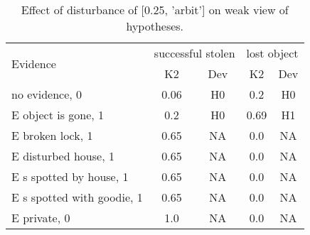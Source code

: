 \begin{table}\begin{tabular}{l|cc|cc}\toprule\multirow{2}{*}{Evidence} & \multicolumn{2}{c}{successful stolen}& \multicolumn{2}{c}{lost object}\\& {K2} & {Dev}& {K2} & {Dev}\\\midrule
no evidence, 0 & \cellcolor{Bittersweet}0.06&\cellcolor{Bittersweet}H0&\cellcolor{Bittersweet}0.2&\cellcolor{Bittersweet}H0\\E object is gone, 1 & \cellcolor{Bittersweet}0.2&\cellcolor{Bittersweet}H0&\cellcolor{Bittersweet}0.69&\cellcolor{Bittersweet}H1\\E broken lock, 1 & \cellcolor{Bittersweet}0.65&\cellcolor{Bittersweet}NA&\cellcolor{Bittersweet}0.0&\cellcolor{Bittersweet}NA\\E disturbed house, 1 & \cellcolor{Bittersweet}0.65&\cellcolor{Bittersweet}NA&\cellcolor{Bittersweet}0.0&\cellcolor{Bittersweet}NA\\E s spotted by house, 1 & \cellcolor{Bittersweet}0.65&\cellcolor{Bittersweet}NA&\cellcolor{Bittersweet}0.0&\cellcolor{Bittersweet}NA\\E s spotted with goodie, 1 & \cellcolor{Bittersweet}0.65&\cellcolor{Bittersweet}NA&\cellcolor{Bittersweet}0.0&\cellcolor{Bittersweet}NA\\E private, 0 & \cellcolor{Bittersweet}1.0&\cellcolor{Bittersweet}NA&\cellcolor{Bittersweet}0.0&\cellcolor{Bittersweet}NA\\\bottomrule\end{tabular}\caption{Effect of disturbance of [0.25, 'arbit'] on weak view of hypotheses.}\end{table}